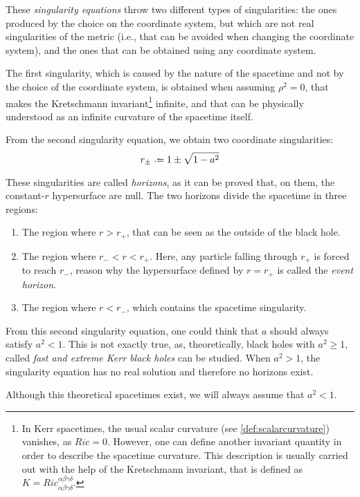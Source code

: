 These \emph{singularity equations} throw two different types of singularities: the ones produced by the choice on the coordinate system, but which are not real singularities of the metric (i.e., that can be avoided when changing the coordinate system), and the ones that can be obtained using any coordinate system.

The first singularity, which is caused by the nature of the spacetime and not by the choice of the coordinate system, is obtained when assuming $\rho^2 = 0$, that makes the Kretschmann invariant\footnote{In Kerr spacetimes, the usual scalar curvature (see \autoref{def:scalarcurvature}) vanishes, as $Ric = 0$. However, one can define another invariant quantity in order to describe the spacetime curvature. This description is usually carried out with the help of the Kretschmann invariant, that is defined as $K = Ric_{\alpha\beta\gamma\delta}^{\alpha\beta\gamma\delta}$.} infinite, and that can be physically understood as an infinite curvature of the spacetime itself.

From the second singularity equation, we obtain two coordinate singularities:
\[
	r_{\pm} \defeq 1 \pm \sqrt{1 - a^2}
\]

These singularities are called \emph{horizons}, as it can be proved \cite[p. 15]{galindo14} that, on them, the constant-$r$ hypersurface are null. The two horizons divide the spacetime in three regions:
\begin{enumerate}
	\item The region where $r > r_+$, that can be seen as the outside of the black hole.
	\item The region where $r_- < r < r_+$. Here, any particle falling through $r_+$ is forced to reach $r_-$, reason why the hypersurface defined by $r = r_+$ is called the \emph{event horizon}.
	\item The region where $r < r_-$, which contains the spacetime singularity.
\end{enumerate}

\begin{remark}
	From this second singularity equation, one could think that $a$ should always satisfy $a^2 < 1$. This is not exactly true, as, theoretically, black holes with $a^2 \geq 1$, called \emph{fast and extreme Kerr black holes} can be studied. When $a^2 > 1$, the singularity equation has no real solution and therefore no horizons exist.
	
	Although this theoretical spacetimes exist, we will always assume that $a^2 < 1$.
\end{remark}

